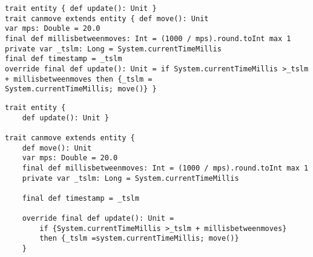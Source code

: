 \begin{lstlisting}
trait entity { def update(): Unit }
trait canmove extends entity { def move(): Unit
var mps: Double = 20.0
final def millisbetweenmoves: Int = (1000 / mps).round.toInt max 1
private var _tslm: Long = System.currentTimeMillis
final def timestamp = _tslm
override final def update(): Unit = if System.currentTimeMillis >_tslm + millisbetweenmoves then {_tslm =
System.currentTimeMillis; move()} }
\end{lstlisting}

\begin{lstlisting}
trait entity { 
	def update(): Unit }
	
trait canmove extends entity { 
	def move(): Unit
	var mps: Double = 20.0
	final def millisbetweenmoves: Int = (1000 / mps).round.toInt max 1
	private var _tslm: Long = System.currentTimeMillis
	
	final def timestamp = _tslm
	
	override final def update(): Unit = 
		if {System.currentTimeMillis >_tslm + millisbetweenmoves}
		then {_tslm =system.currentTimeMillis; move()} 
	}
\end{lstlisting}
